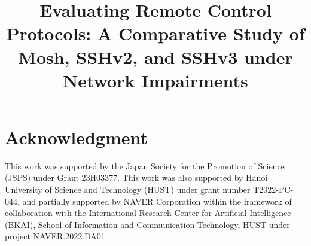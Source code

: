 \documentclass[conference]{IEEEtran}
\begin{document}


\newcommand{\thanhnt}[1] { {\color{blue}{#1}}}

\title{Evaluating Remote Control Protocols: A Comparative Study of Mosh, SSHv2, and SSHv3 under Network Impairments}

\author{
}

\maketitle
\thispagestyle{plain}
\pagestyle{plain}










\section*{Acknowledgment}
This work was supported by the Japan Society for the Promotion of Science (JSPS) under Grant 23H03377. This work was also supported by Hanoi University of Science and Technology (HUST) under grant number T2022-PC-044, and partially supported by NAVER Corporation within the framework of collaboration with the International Research Center for Artificial Intelligence (BKAI), School of Information and Communication Technology, HUST under project NAVER.2022.DA01.

%

{}
\end{document}
